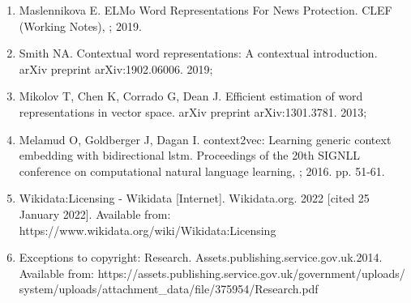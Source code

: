 \begin{enumerate}
    \item \hypertarget{31}{Maslennikova E. ELMo Word Representations For News Protection. CLEF (Working Notes), ; 2019.}
    
    \item \hypertarget{32}{Smith NA. Contextual word representations: A contextual introduction. arXiv preprint arXiv:1902.06006. 2019;}
     
    \item \hypertarget{33}{Mikolov T, Chen K, Corrado G, Dean J. Efficient estimation of word representations in vector space. arXiv preprint arXiv:1301.3781. 2013;}
    
    \item \hypertarget{34}{Melamud O, Goldberger J, Dagan I. context2vec: Learning generic context embedding with bidirectional lstm. Proceedings of the 20th SIGNLL conference on computational natural language learning, ; 2016. pp. 51-61.}
    
    \item \hypertarget{35}{Wikidata:Licensing - Wikidata [Internet]. Wikidata.org. 2022 [cited 25 January 2022]. Available from: https://www.wikidata.org/wiki/Wikidata:Licensing}
    
    \item \hypertarget{36}{Exceptions to copyright: Research. Assets.publishing.service.gov.uk.2014. 
    Available from: https://assets.publishing.service.gov.uk/government/uploads/
    \linebreak
    system/uploads/attachment\_data/file/375954/Research.pdf}
    

    
\end{enumerate}